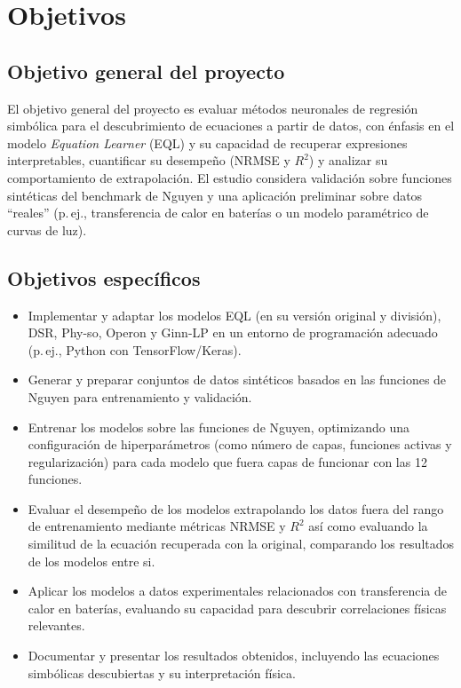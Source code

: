 \newpage
\section{Objetivos}

\subsection*{Objetivo general del proyecto}
El objetivo general del proyecto es evaluar métodos neuronales de regresión simbólica para el descubrimiento de ecuaciones a partir de datos, con énfasis en el modelo \textit{Equation Learner} (EQL) y su capacidad de recuperar expresiones interpretables, cuantificar su desempeño (NRMSE y $R^2$) y analizar su comportamiento de extrapolación. El estudio considera validación sobre funciones sintéticas del benchmark de Nguyen y una aplicación preliminar sobre datos “reales” (p.\,ej., transferencia de calor en baterías o un modelo paramétrico de curvas de luz).

\subsection*{Objetivos específicos}
\begin{itemize}
    \item Implementar y adaptar los modelos EQL (en su versión original y división), DSR, Phy-so, Operon y Ginn-LP en un entorno de programación adecuado (p.\,ej., Python con TensorFlow/Keras).
    \item Generar y preparar conjuntos de datos sintéticos basados en las funciones de Nguyen para entrenamiento y validación.
    \item Entrenar los modelos sobre las funciones de Nguyen, optimizando una configuración de hiperparámetros (como número de capas, funciones activas y regularización) para cada modelo que fuera capas de funcionar con las 12 funciones.
    \item Evaluar el desempeño de los modelos extrapolando los datos fuera del rango de entrenamiento mediante métricas NRMSE y $R^2$ así como evaluando la similitud de la ecuación recuperada con la original, comparando los resultados de los modelos entre si.
    \item Aplicar los modelos a datos experimentales relacionados con transferencia de calor en baterías, evaluando su capacidad para descubrir correlaciones físicas relevantes.
    \item Documentar y presentar los resultados obtenidos, incluyendo las ecuaciones simbólicas descubiertas y su interpretación física.
\end{itemize}


